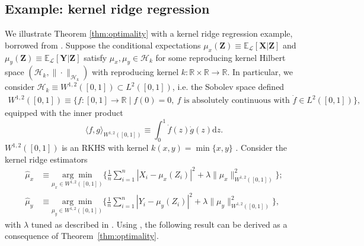 \documentclass[12pt]{article}
\theoremstyle{definition}
\theoremstyle{remark}
\newcommand{\E}{\mathbb E}								%
\newcommand{\argmin}[1]{\underset{#1}{\arg \min}}       %
\newcommand{\prx}{\bm X}								%
\newcommand{\prz}{\bm Z}								%
\newcommand{\pry}{{\bm Y}}								%
\newcommand{\law}{\mathcal L}							%
\renewcommand{\H}{\mathcal H}		 					%
\begin{document}
	\subsection{Example: kernel ridge regression} \label{sec:kernel-ridge-regression}
	We illustrate Theorem \ref{thm:optimality} with a kernel ridge regression example, borrowed from \citet[Section 4]{Shah2018}. Suppose the conditional expectations $\mu_x(\prz) \equiv \E_{\law}[\prx|\prz]$ and $\mu_y(\prz) \equiv \E_{\law}[\pry|\prz]$ satisfy $\mu_x, \mu_y \in \H_k$ for some reproducing kernel Hilbert space $(\H_k,\|\cdot\|_{\H_k})$ with reproducing kernel $k:\mathbb{R}\times\mathbb{R}\rightarrow\mathbb{R}$. In particular, we consider $\H_k \equiv W^{1,2}([0,1]) \subset L^2([0,1])$, i.e. the Sobolev space defined 
	\begin{align*}
		W^{1,2}([0,1]) \equiv \big\{f:[0,1]\rightarrow \mathbb{R} \mid f(0)=0,\ f \text{ is absolutely continuous with } \dot{f}\in L^2([0,1])\big\},
	\end{align*} 
	equipped with the inner product
	\begin{equation*}
		\langle f,g\rangle_{W^{1,2}([0,1])} \equiv \int_0^1\dot{f}(z)\dot{g}(z)\mathrm{d}z.
	\end{equation*}
	$W^{1,2}([0,1])$ is an RKHS with kernel $k(x,y)=\min\{x,y\}$ \citep[Example 12.16]{Wainwright2019}. Consider the kernel ridge estimators
	\begin{equation}
		\begin{split}
			\widehat \mu_x &\equiv \argmin{\mu_x \in W^{1,2}([0,1])}\bigg\{\frac{1}{n}\sum_{i=1}^n|X_i-\mu_x(Z_i)|^2+\lambda\|\mu_x\|_{W^{1,2}([0,1])}^2\bigg\};\\ 
			\widehat \mu_y &\equiv \argmin{\mu_y \in W^{1,2}([0,1])}\bigg\{\frac{1}{n}\sum_{i=1}^n|Y_i-\mu_y(Z_i)|^2+\lambda\|\mu_y\|_{W^{1,2}([0,1])}^2\bigg\},
			\label{eq:kernel-ridge-estimators}
		\end{split}
	\end{equation}
	with $\lambda$ tuned as described in \citet[Section 4]{Shah2018}. Using \citet[Theorem 11]{Shah2018}, the following result can be derived as a consequence of Theorem~\ref{thm:optimality}.
	
\end{document}
